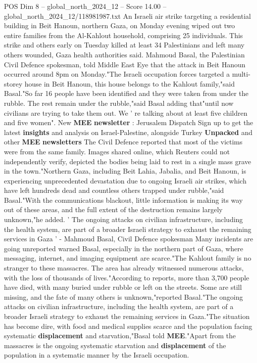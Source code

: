 \begin{textsample}{POS Dim 8 – global\_north\_2024\_12 – Score 14.00 – global\_north\_2024\_12/118981987.txt}  \label{ex:f8_pos_092}
An Israeli air strike targeting a residential building in Beit Hanoun, northern Gaza, on Monday evening wiped out two entire families from the Al-Kahlout household, comprising 25 individuals.
This strike and others early on Tuesday killed at least 34 Palestinians and left many others wounded, Gaza health authorities said.
Mahmoud Basal, the Palestinian Civil Defence spokesman, told Middle East Eye that the attack in Beit Hanoun occurred around 8pm on Monday."The Israeli occupation forces targeted a multi-storey house in Beit Hanoun, this house belongs to the Kahlout family,"said Basal."So far 16 people have been identified and they were taken from under the rubble.
The rest remain under the rubble,"said Basal adding that"until now civilians are trying to take them out.
We ' re talking about at least five children and five women".
New \textbf{MEE} \textbf{newsletter} : Jerusalem Dispatch Sign up to get the latest \textbf{insights} and analysis on Israel-Palestine, alongside Turkey \textbf{Unpacked} and other \textbf{MEE} \textbf{newsletters} The Civil Defence reported that most of the victims were from the same family.
Images shared online, which Reuters could not independently verify, depicted the bodies being laid to rest in a single mass grave in the town."Northern Gaza, including Beit Lahia, Jabalia, and Beit Hanoun, is experiencing unprecedented devastation due to ongoing Israeli air strikes, which have left hundreds dead and countless others trapped under rubble,"said Basal."With the communications blackout, little information is making its way out of these areas, and the full extent of the destruction remains largely unknown,"he added. ' The ongoing attacks on civilian infrastructure, including the health system, are part of a broader Israeli strategy to exhaust the remaining services in Gaza ' - Mahmoud Basal, Civil Defence spokesman Many incidents are going unreported warned Basal, especially in the northern part of Gaza, where messaging, internet, and imaging equipment are scarce."The Kahlout family is no stranger to these massacres.
The area has already witnessed numerous attacks, with the loss of thousands of lives."According to reports, more than 3,700 people have died, with many buried under rubble or left on the streets.
Some are still missing, and the fate of many others is unknown,"reported Basal."The ongoing attacks on civilian infrastructure, including the health system, are part of a broader Israeli strategy to exhaust the remaining services in Gaza."The situation has become dire, with food and medical supplies scarce and the population facing systematic \textbf{displacement} and starvation,"Basal told \textbf{MEE}."Apart from the massacres is the ongoing systematic starvation and \textbf{displacement} of the population in a systematic manner by the Israeli occupation.

\end{textsample}
